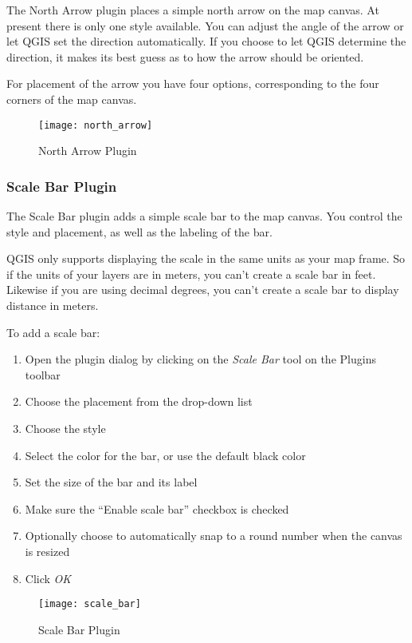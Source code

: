 The North Arrow plugin places a simple north arrow on the map canvas. At
present there is only one style available. You can adjust the angle of the
arrow or let QGIS set the direction automatically. If you choose to let
QGIS determine the direction, it makes its best guess as to how the arrow
should be oriented.

For placement of the arrow you have four options, corresponding to the four 
corners of the map canvas.

\begin{figure}[ht]
   \begin{center}
   \caption{North Arrow Plugin}\label{fig:north_arrow}\smallskip
   \texttt{[image: north\_arrow]}
\end{center}  
\end{figure}

\subsubsection{Scale Bar Plugin}
The Scale Bar plugin adds a simple scale bar to the map canvas. You
control the style and placement, as well as the labeling of the bar. 

QGIS only supports displaying the scale in the same units as your map frame. So
if the units of your layers are in meters, you can't create a scale bar in
feet. Likewise if you are using decimal degrees, you can't create a scale
bar to display distance in meters.

To add a scale bar:

\begin{enumerate}
\item Open the plugin dialog by clicking on the \textsl{Scale Bar} tool
  on the Plugins toolbar
\item Choose the placement from the drop-down list
\item Choose the style
\item Select the color for the bar, or use the default black color
\item Set the size of the bar and its label
\item Make sure the ``Enable scale bar'' checkbox is checked
\item Optionally choose to automatically snap to a round number when the
  canvas is resized
\item Click \textsl{OK} 
\end{enumerate} 

\begin{figure}[ht]
   \begin{center}
   \caption{Scale Bar Plugin}\label{fig:scale_bar}\smallskip
   \texttt{[image: scale\_bar]}
\end{center}  
\end{figure}

